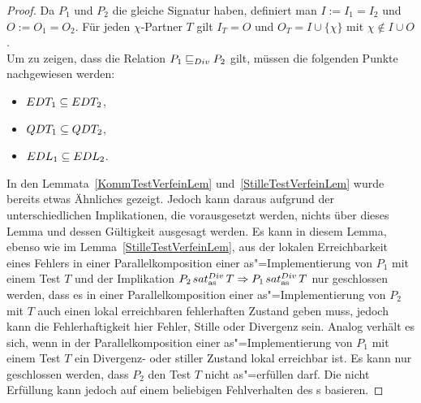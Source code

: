 \begin{proof}
  Da $P_1$ und $P_2$ die gleiche Signatur haben, definiert man $I:=I_1=I_2$ und
  $O:=O_1=O_2$. Für jeden $\chi$-Partner $T$ gilt $I_T=O$ und $O_T =
  I\cup\{\chi\}$ mit $\chi\notin I\cup O$.\\
  Um zu zeigen, dass die Relation $P_1 \sqsubseteq  _{Div} P_2$ gilt, müssen die folgenden
  Punkte nachgewiesen werden:
  \begin{itemize}
    \item $EDT _1\subseteq EDT _2$,
    \item $QDT _1\subseteq QDT _2$,
    \item $EDL _1\subseteq EDL _2$.
  \end{itemize}
  In den Lemmata~\ref{KommTestVerfeinLem} und~\ref{StilleTestVerfeinLem} wurde
  bereits etwas Ähnliches gezeigt. Jedoch kann daraus aufgrund der
  unterschiedlichen Implikationen, die vorausgesetzt werden, nichts über dieses
  Lemma und dessen Gültigkeit ausgesagt werden. Es kann in diesem Lemma, ebenso
  wie im Lemma~\ref{StilleTestVerfeinLem}, aus der lokalen Erreichbarkeit eines
  Fehlers in einer Parallelkomposition einer as"=Implementierung von $P_1$ mit
  einem Test $T$ und der Implikation $P_2 \hspace{0.05cm}sat_\mathrm{as}^{Div}\hspace{0.05cm} T\Rightarrow P_1 \hspace{0.05cm}sat_\mathrm{as}^{Div}\hspace{0.05cm} T$
  nur geschlossen werden, dass es in einer Parallelkomposition einer
  as"=Implementierung von $P_2$ mit $T$ auch einen lokal erreichbaren
  fehlerhaften Zustand geben muss, jedoch kann die Fehlerhaftigkeit hier
  Fehler, Stille oder Divergenz sein. Analog verhält es sich, wenn in der
  Parallelkomposition einer as"=Implementierung von $P_1$ mit einem Test $T$
  ein Divergenz- oder stiller Zustand lokal erreichbar ist. Es kann nur
  geschlossen werden, dass $P_2$ den Test $T$ nicht as"=erfüllen darf. Die
  nicht Erfüllung kann jedoch auf einem beliebigen Fehlverhalten des \MEIO{}s
  basieren.


\end{proof}
